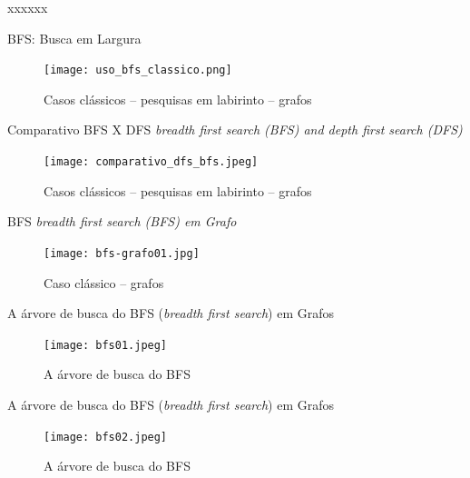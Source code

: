 \begin{frame}[c]{xxxxxx} 

		   	\begin{figure}[!htpb]
				\centering
			\end{figure} 
\end{frame}



\begin{frame}[c]{BFS: Busca em Largura} 

		   	\begin{figure}[!htpb]
				\centering
\texttt{[image: uso\_bfs\_classico.png]}
\caption{Casos clássicos -- pesquisas em labirinto -- grafos}
			\end{figure} 
    \end{frame}


\begin{frame}[c]{Comparativo BFS X DFS \textit{breadth first search (BFS) and depth first search (DFS)} }

 	\begin{figure}[!htpb]
	\centering
  \texttt{[image: comparativo\_dfs\_bfs.jpeg]}
 \caption{Casos clássicos -- pesquisas em labirinto -- grafos}
	\end{figure} 
\end{frame}


\begin{frame}[c]{BFS \textit{breadth first search (BFS) em Grafo}}

 	\begin{figure}[!htpb]
	\centering
  \texttt{[image: bfs-grafo01.jpg]}
 \caption{Caso clássico -- grafos}
	\end{figure} 
\end{frame}


\begin{frame}[c]{A árvore de busca do BFS (\textit{breadth first search})  em Grafos}

 	\begin{figure}[!htpb]
	\centering
  \texttt{[image: bfs01.jpeg]}
 \caption{A árvore de busca do BFS}
	\end{figure} 
\end{frame}



\begin{frame}[c]{A árvore de busca do BFS (\textit{breadth first search})  em Grafos}

 	\begin{figure}[!htpb]
	\centering
  \texttt{[image: bfs02.jpeg]}
 \caption{A árvore de busca do BFS}
	\end{figure} 
\end{frame}

